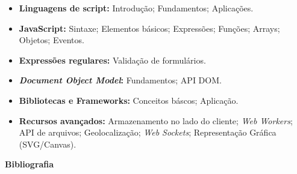 \begin{itemize}

\item \textbf{Linguagens de script:}
    Introdução; Fundamentos; Aplicações.

\item \textbf{JavaScript:}
    Sintaxe; Elementos básicos; Expressões; Funções; Arrays; Objetos; Eventos.

\item \textbf{Expressões regulares:}
    Validação de formulários.

\item \textbf{\textit{Document Object Model}:}
    Fundamentos; API DOM.

\item \textbf{Bibliotecas e Frameworks:}
    Conceitos báscos; Aplicação.

\item \textbf{Recursos avançados:}
    Armazenamento no lado do cliente; \textit{Web Workers}; API de arquivos; Geolocalização; \textit{Web Sockets}; Representação Gráfica (SVG/Canvas).

\end{itemize}







\begin{snugshade}\begin{center}\textbf{
    Bibliografia
}\end{center}\end{snugshade}

